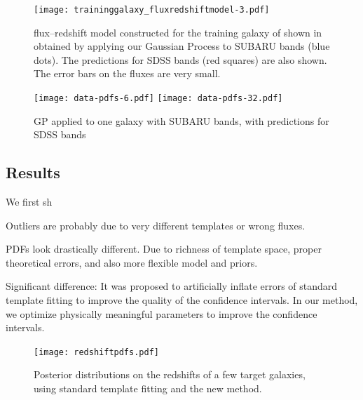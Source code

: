 \documentclass[aps,prd,showpacs,superscriptaddress,groupedaddress]{revtex4}  %
\begin{document}
\begin{figure}
\texttt{[image: traininggalaxy\_fluxredshiftmodel-3.pdf]}
\caption{flux--redshift model constructed for the training galaxy of  shown in  obtained by applying our Gaussian Process to SUBARU bands (blue dots). The predictions for SDSS bands (red squares) are also shown. The error bars on the fluxes are very small.}
\label{fig:traininggalaxy_fluxredshiftmodel}
\end{figure} 

\begin{figure}
\texttt{[image: data-pdfs-6.pdf]}
\texttt{[image: data-pdfs-32.pdf]}
\caption{GP applied to one galaxy with SUBARU bands, with predictions for SDSS bands}
\label{fig:datapdfs}
\end{figure}


\subsection{Results}

We first sh



Outliers are probably due to very different templates or wrong fluxes.

PDFs  look drastically different. Due to richness of template space, proper theoretical errors, and also more flexible model and priors.

Significant difference:
It was proposed to artificially inflate errors of standard template fitting to improve the quality of the confidence intervals.
In our method, we optimize physically meaningful parameters to improve the confidence intervals.

\begin{figure}
\texttt{[image: redshiftpdfs.pdf]}
\caption{Posterior distributions on the redshifts of a few target galaxies, using standard template fitting and the new method.}
\label{fig:redshiftpdfs}
\end{figure}
\end{document}
